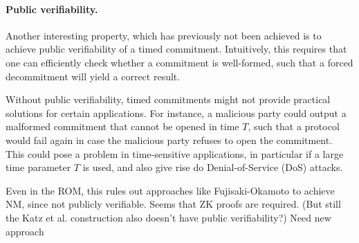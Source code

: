 \paragraph{Public verifiability.}
Another interesting property, which has previously not been achieved  is to achieve public verifiability of a timed commitment. Intuitively, this requires that one can efficiently check whether a commitment is well-formed, such that a forced decommitment will yield a correct result.

Without public verifiability, timed commitments might not provide practical solutions for certain applications. For instance, a malicious party could output a malformed commitment that cannot be opened in time $T$, such that a protocol would fail again in case the malicious party refuses to open the commitment. This could pose a problem in time-sensitive applications, in particular if a large time parameter $T$ is used, and also give rise do Denial-of-Service (DoS) attacks.



Even in the ROM, this rules out approaches like Fujisaki-Okamoto to achieve NM, since not publicly verifiable. Seems that ZK proofs are required. (But still the Katz et al. construction also doesn't have public verifiability?) Need new approach






